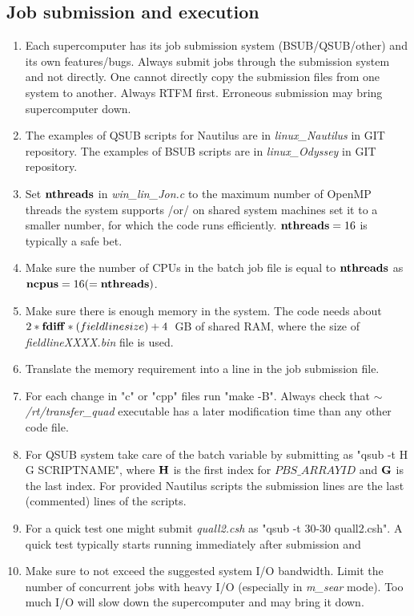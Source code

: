 \documentclass{emulateapj}
\begin{document}
\subsection{Job submission and execution}
\begin{enumerate}
\item{Each supercomputer has its job submission system (BSUB/QSUB/other) and its own features/bugs. Always submit jobs through the submission system and not directly.
One cannot directly copy the submission files from one system to another. Always RTFM first. Erroneous submission may bring supercomputer down.}
\item{The examples of QSUB scripts for Nautilus are in \textit{linux\_Nautilus} in GIT repository. The examples of BSUB scripts are in \textit{linux\_Odyssey} in GIT repository.}
\item{Set ${\bf nthreads}$ in \textit{win\_lin\_Jon.c} to the maximum number of OpenMP threads the system supports /or/ on shared system machines set it to a smaller number,
 for which the code runs efficiently. ${\bf nthreads}=16$ is typically a safe bet.}
\item{Make sure the number of CPUs in the batch job file is equal to ${\bf nthreads}$ as ${\bf ncpus}=16(={\bf nthreads})$.}
\item{Make sure there is enough memory in the system. The code needs about $2*{\bf fdiff}*(fieldline size)+4$~GB of shared RAM, where the size of \textit{fieldlineXXXX.bin} file is used.}
\item{Translate the memory requirement into a line in the job submission file.}
\item{For each change in "c" or "cpp" files run "make -B". Always check that \textit{$\sim$/rt/transfer\_quad} executable has a later modification time than any other code file.}
\item{For QSUB system take care of the batch variable by submitting as "qsub -t H G SCRIPTNAME", where $\bf H$ is the first index for $PBS\_ARRAYID$ and $\bf G$ is the last index.
For provided Nautilus scripts the submission lines are the last (commented) lines of the scripts.}
\item{For a quick test one might submit \textit{quall2.csh} as "qsub -t 30-30 quall2.csh". A quick test typically starts running immediately after submission and }
\item{Make sure to not exceed the suggested system I/O bandwidth. Limit the number of concurrent jobs with heavy I/O (especially in \textit{m\_sear} mode).
Too much I/O will slow down the supercomputer and may bring it down.}

\end{enumerate}
\end{document}
